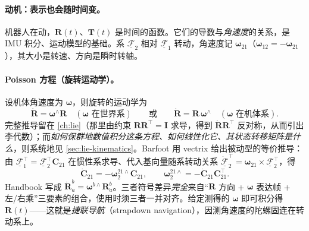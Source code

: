 \paragraph{动机：表示也会随时间变。}机器人在动，$\mathbf{R}(t)$、$\mathbf{T}(t)$ 是时间的函数。它们的导数与\emph{角速度}的关系，是 IMU 积分、运动模型的基础。系 $\underline{\mathcal{F}}_2$ 相对 $\underline{\mathcal{F}}_1$ 转动，角速度记 $\boldsymbol{\omega}_{21}$（$\boldsymbol{\omega}_{12}=-\boldsymbol{\omega}_{21}$），其大小是转速、方向是瞬时转轴\cite{barfoot2024state}。

\paragraph{Poisson 方程（旋转运动学）。}设机体角速度为 $\boldsymbol{\omega}$，则旋转的运动学为
\begin{equation}
  \dot{\mathbf{R}}=\boldsymbol{\omega}^\wedge\mathbf{R}\quad(\boldsymbol{\omega}\text{ 在世界系})\qquad\text{或}\qquad
  \dot{\mathbf{R}}=\mathbf{R}\,\boldsymbol{\omega}^\wedge\quad(\boldsymbol{\omega}\text{ 在机体系}).
  \label{eq:poisson}
\end{equation}
完整推导留在 \cref{ch:lie}（那里由约束 $\mathbf{R}\mathbf{R}^\top=\mathbf{I}$ 求导，得到 $\dot{\mathbf{R}}\mathbf{R}^\top$ 反对称，从而引出李代数）；而\emph{如何保群地数值积分这条方程、如何线性化它、其状态转移矩阵是什么}，则系统地见 \cref{sec:lie-kinematics}。Barfoot 用 vectrix 给出被动型的等价推导\cite{barfoot2024state}：由 $\underline{\mathcal{F}}_1^\top=\underline{\mathcal{F}}_2^\top\mathbf{C}_{21}$ 在惯性系求导、代入基向量随系转动关系 $\dot{\underline{\mathcal{F}}}_2^\top=\boldsymbol{\omega}_{21}\times\underline{\mathcal{F}}_2^\top$，得
\begin{equation}
  \dot{\mathbf{C}}_{21}=-\boldsymbol{\omega}_2^{21\wedge}\mathbf{C}_{21},\qquad
  \boldsymbol{\omega}_2^{21\wedge}=-\dot{\mathbf{C}}_{21}\mathbf{C}_{21}^\top.
  \label{eq:rb-poisson-barfoot}
\end{equation}
Handbook 写成 $\dot{\mathbf{R}}_a^b=\boldsymbol{\omega}^{b\wedge}\mathbf{R}_a^b$\cite{carlone2026handbook}。三者符号差异\emph{完全}来自“$\mathbf{R}$ 方向 + $\boldsymbol{\omega}$ 表达帧 + 左/右乘”三要素的组合，使用时须三者一并对齐。给定测得的 $\boldsymbol{\omega}$ 即可积分得 $\mathbf{R}(t)$——这就是\emph{捷联导航}（strapdown navigation），因测角速度的陀螺固连在转动系上。

